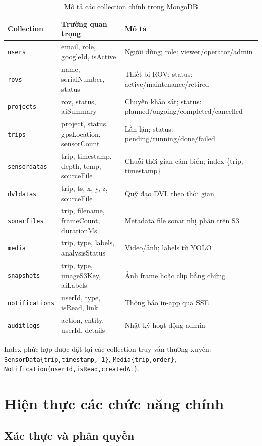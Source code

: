 \documentclass[../DoAn.tex]{subfiles}
\begin{document}
\begin{table}[H]
\centering
\caption{Mô tả các collection chính trong MongoDB}
\label{tab:collections}
\small
\begin{tabular}{|p{2.8cm}|p{4.0cm}|p{5.6cm}|}
\hline
\textbf{Collection} & \textbf{Trường quan trọng} & \textbf{Mô tả} \\
\hline
\texttt{users} & email, role, googleId, isActive & Người dùng; role: viewer/operator/admin \\
\hline
\texttt{rovs} & name, serialNumber, status & Thiết bị ROV; status: active/maintenance/retired \\
\hline
\texttt{projects} & rov, status, aiSummary & Chuyến khảo sát; status: planned/ongoing/completed/cancelled \\
\hline
\texttt{trips} & project, status, gpsLocation, sensorCount & Lần lặn; status: pending/running/done/failed \\
\hline
\texttt{sensordatas} & trip, timestamp, depth, temp, sourceFile & Chuỗi thời gian cảm biến; index \{trip, timestamp\} \\
\hline
\texttt{dvldatas} & trip, ts, x, y, z, sourceFile & Quỹ đạo DVL theo thời gian \\
\hline
\texttt{sonarfiles} & trip, filename, frameCount, durationMs & Metadata file sonar nhị phân trên S3 \\
\hline
\texttt{media} & trip, type, labels, analysisStatus & Video/ảnh; labels từ YOLO \\
\hline
\texttt{snapshots} & trip, type, imageS3Key, aiLabels & Ảnh frame hoặc clip bằng chứng \\
\hline
\texttt{notifications} & userId, type, isRead, link & Thông báo in-app qua SSE \\
\hline
\texttt{auditlogs} & action, entity, userId, details & Nhật ký hoạt động admin \\
\hline
\end{tabular}
\end{table}

Index phức hợp được đặt tại các collection truy vấn thường xuyên: \texttt{SensorData\{trip,timestamp,-1\}}, \texttt{Media\{trip,order\}}, \texttt{Notification\{userId,isRead,createdAt\}}.

\section{Hiện thực các chức năng chính}
\label{section:4.3}

\subsection{Xác thực và phân quyền}
\end{document}
